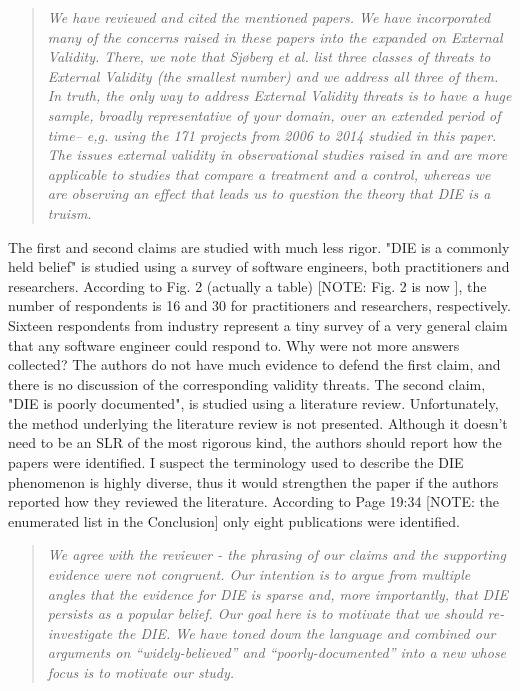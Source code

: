 \begin{quote}{\em 
 We have reviewed and cited the mentioned papers. We have incorporated many of the concerns raised in these papers into the expanded  on External Validity.
 There, we note that Sj{\o}berg et al. list three classes of threats to External Validity (the smallest number) and we address all three of them. In truth, the only way to address External Validity threats is to have a huge sample, broadly representative of your domain, over an extended period of time-- e,g. using the 171 projects from 2006 to 2014 studied in this paper. The issues external validity in observational studies raised in \cite{madigan2014} and \cite{carlson2009} are more applicable to studies that compare a treatment and a control, whereas we are observing an effect that leads us to question the theory that DIE is a truism.
}\end{quote}

The first and second claims are studied with much less
rigor. "DIE is a commonly held belief" is studied using a
survey of software engineers, both practitioners and
researchers. According to Fig. 2 (actually a table) [NOTE: Fig. 2 is now ], the
number of respondents is 16 and 30 for practitioners and
researchers, respectively. Sixteen respondents from industry
represent a tiny survey of a very general claim that any
software engineer could respond to. Why were not more
answers collected? The authors do not have much evidence to
defend the first claim, and there is no discussion of the
corresponding validity threats. The second claim, "DIE is
poorly documented", is studied using a literature review.
Unfortunately, the method underlying the literature review
is not presented. Although it doesn't need to be an SLR of
the most rigorous kind, the authors should report how the
papers were identified. I suspect the terminology used to
describe the DIE phenomenon is highly diverse, thus it would
strengthen the paper if the authors reported how they
reviewed the literature. According to Page 19:34 [NOTE: the enumerated list in the Conclusion] only eight
publications were identified. 


\begin{quote}{\em We agree with the reviewer - the phrasing of our claims and the supporting evidence were not congruent. Our intention is to argue from multiple angles that the evidence for DIE is sparse and, more importantly, that DIE persists as a popular belief. Our goal here is to motivate that we should re-investigate the DIE. We have toned down the language and combined our arguments on ``widely-believed'' and ``poorly-documented'' into a new  whose focus is to motivate our study.}\end{quote}


